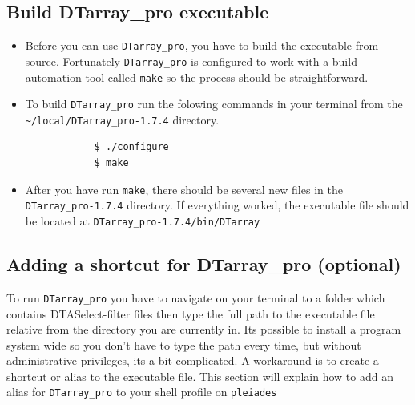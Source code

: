 \documentclass[12pt]{article}
\newcommand{\VERSION}{1.7.4}
\begin{document}
	\subsection{Build DTarray\_pro executable}
	\begin{itemize}
		\item Before you can use \texttt{DTarray\_pro}, you have to build the executable from source. Fortunately \texttt{DTarray\_pro} is configured to work with a build automation tool called \texttt{make} so the process should be straightforward.
		
		\item To build \texttt{DTarray\_pro} run the folowing commands in your terminal from the \texttt{\textasciitilde/local/DTarray\_pro-\VERSION} directory.
		
		\begin{lstlisting}
			$ ./configure
			$ make
		\end{lstlisting}
		
		\item After you have run \texttt{make}, there should be several new files in the \texttt{DTarray\_pro-\VERSION} directory.  If everything worked, the executable file should be located at \texttt{DTarray\_pro-\VERSION/bin/DTarray}
		
	\end{itemize}

	\subsection{Adding a shortcut for DTarray\_pro (optional)}
	
	To run \texttt{DTarray\_pro} you have to navigate on your terminal to a folder which contains DTASelect-filter files then type the full path to the executable file relative from the directory you are currently in.  Its possible to install a program system wide so you don't have to type the path every time, but without administrative privileges, its a bit complicated. A workaround is to create a shortcut or alias to the executable file.  This section will explain how to add an alias for \texttt{DTarray\_pro} to your shell profile on \texttt{pleiades}
	
\end{document}
